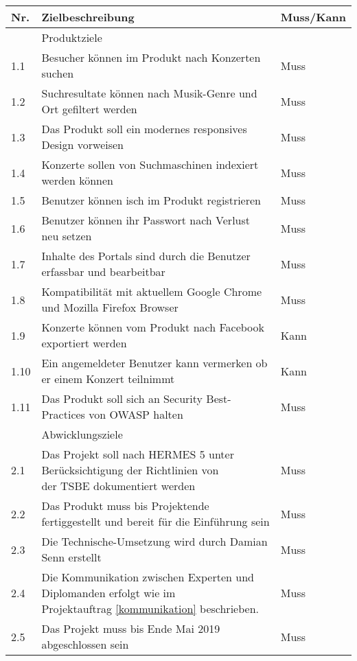 \begin{longtable}[]{@{}lll@{}}
  \toprule
  Nr.  & Zielbeschreibung                                                                       & Muss/Kann\tabularnewline
  \toprule
       & Produktziele\tabularnewline
  \midrule
  1.1  & Besucher können im Produkt nach Konzerten suchen                                       & Muss\tabularnewline
  1.2  & Suchresultate können nach Musik-Genre und Ort gefiltert werden                         & Muss\tabularnewline
  1.3  & Das Produkt soll ein modernes responsives Design vorweisen                             & Muss\tabularnewline
  1.4  & Konzerte sollen von Suchmaschinen indexiert werden können                              & Muss\tabularnewline
  1.5  & Benutzer können isch im Produkt registrieren                                           & Muss\tabularnewline
  1.6  & Benutzer können ihr Passwort nach Verlust neu setzen                                   & Muss\tabularnewline
  1.7  & Inhalte des Portals sind durch die Benutzer erfassbar und bearbeitbar                  & Muss\tabularnewline
  1.8  & Kompatibilität mit aktuellem Google Chrome und Mozilla Firefox Browser                 & Muss\tabularnewline
  1.9  & Konzerte können vom Produkt nach Facebook exportiert werden                            & Kann\tabularnewline
  1.10 & Ein angemeldeter Benutzer kann vermerken ob er einem Konzert teilnimmt                 & Kann\tabularnewline
  1.11 & Das Produkt soll sich an Security Best-Practices von OWASP halten                      & Muss\tabularnewline
  \bottomrule
       & Abwicklungsziele\tabularnewline
  \midrule
  2.1  & \makecell[l]{Das Projekt soll nach HERMES 5 unter Berücksichtigung der Richtlinien von                            \\ der TSBE dokumentiert werden} & Muss\tabularnewline
  2.2  & Das Produkt muss bis Projektende fertiggestellt und bereit für die Einführung sein     & Muss\tabularnewline
  2.3  & Die Technische-Umsetzung wird durch Damian Senn erstellt                               & Muss\tabularnewline
  2.4  & \makecell[l]{Die Kommunikation zwischen Experten und Diplomanden erfolgt wie im                                   \\ Projektauftrag \ref{kommunikation} beschrieben.} & Muss\tabularnewline
  2.5  & Das Projekt muss bis Ende Mai 2019 abgeschlossen sein                                  & Muss\tabularnewline
  \bottomrule
\end{longtable}
